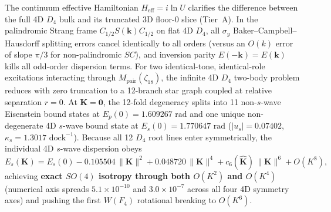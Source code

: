 The continuum effective Hamiltonian $H_{\mathrm{eff}} = i \ln U$ clarifies the difference between the full 4D $D_4$
bulk and its truncated 3D floor-0 slice (Tier~A). In the palindromic Strang frame $C_{1/2} S(\mathbf{k}) C_{1/2}$ on
flat 4D $D_4$, all $\sigma_y$ Baker--Campbell--Hausdorff splitting errors cancel identically to all orders (versus an
$O(k)$ error of slope $\pi/3$ for non-palindromic $S C$), and inversion parity $E(-\mathbf{k}) = E(\mathbf{k})$ kills
all odd-order dispersion terms. For two identical-tone, identical-role excitations interacting through
$M_{\mathrm{pair}}(\zeta_{18})$, the infinite 4D $D_4$ two-body problem reduces with zero truncation to a 12-branch
star graph coupled at relative separation $r = 0$. At $\mathbf{K} = \mathbf{0}$, the 12-fold degeneracy splits into 11
non-$s$-wave Eisenstein bound states at $E_p(0) = 1.609267\text{ rad}$ and one unique non-degenerate 4D $s$-wave bound
state at $E_s(0) = 1.770647\text{ rad}$ ($|u_s| = 0.07402$, $\kappa_s = 1.3017\text{ dock}^{-1}$). Because all 12 $D_4$
root lines enter symmetrically, the individual 4D $s$-wave dispersion obeys
\begin{equation}
E_s(\mathbf{K}) = E_s(0) - 0.105504\,\|\mathbf{K}\|^2 + 0.048720\,\|\mathbf{K}\|^4 + c_6(\hat{\mathbf{K}})\,\|\mathbf{K}\|^6 + O(K^8),
\label{eq:4d-swave-bch}
\end{equation}
achieving \textbf{exact $SO(4)$ isotropy through both $O(K^2)$ and $O(K^4)$} (numerical axis spreads $5.1 \times
10^{-10}$ and $3.0 \times 10^{-7}$ across all four 4D symmetry axes) and pushing the first $W(F_4)$ rotational breaking
to $O(K^6)$.

